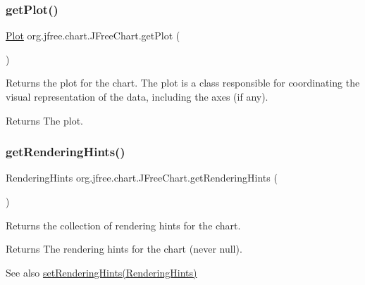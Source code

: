 \subsubsection{\texorpdfstring{get\+Plot()}{getPlot()}}
{\footnotesize\ttfamily \mbox{\hyperlink{classorg_1_1jfree_1_1chart_1_1plot_1_1_plot}{Plot}} org.\+jfree.\+chart.\+J\+Free\+Chart.\+get\+Plot (\begin{DoxyParamCaption}{ }\end{DoxyParamCaption})}

Returns the plot for the chart. The plot is a class responsible for coordinating the visual representation of the data, including the axes (if any).

\begin{DoxyReturn}{Returns}
The plot. 
\end{DoxyReturn}
\mbox{\label{classorg_1_1jfree_1_1chart_1_1_j_free_chart_a5fc5f46f5bfff156c5ea85984a618f65}} 
\subsubsection{\texorpdfstring{get\+Rendering\+Hints()}{getRenderingHints()}}
{\footnotesize\ttfamily Rendering\+Hints org.\+jfree.\+chart.\+J\+Free\+Chart.\+get\+Rendering\+Hints (\begin{DoxyParamCaption}{ }\end{DoxyParamCaption})}

Returns the collection of rendering hints for the chart.

\begin{DoxyReturn}{Returns}
The rendering hints for the chart (never {\ttfamily null}).
\end{DoxyReturn}
\begin{DoxySeeAlso}{See also}
\mbox{\hyperlink{classorg_1_1jfree_1_1chart_1_1_j_free_chart_a770652c440a2e4482389ef1608c31e09}{set\+Rendering\+Hints(\+Rendering\+Hints)}} 
\end{DoxySeeAlso}
\mbox{\label{classorg_1_1jfree_1_1chart_1_1_j_free_chart_a4eb1ebe0bedff91b3343cf1a71ecbade}} 
